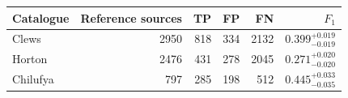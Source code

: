 \begin{tabular}{@{}lrrrrr@{}}
\toprule
Catalogue & Reference sources & TP & FP & FN & \(F_1\) \\
\midrule
Clews & 2950 & 818 & 334 & 2132 & \(0.399_{-0.019}^{+0.019}\) \\
Horton & 2476 & 431 & 278 & 2045 & \(0.271_{-0.020}^{+0.020}\) \\
Chilufya & 797 & 285 & 198 & 512 & \(0.445_{-0.035}^{+0.033}\) \\
\bottomrule
\end{tabular}
